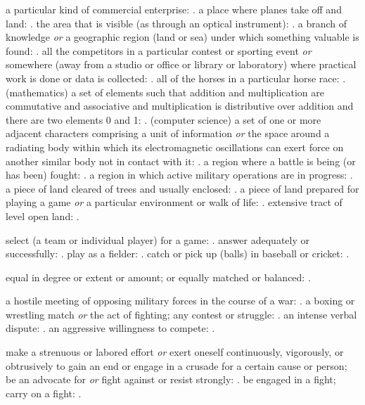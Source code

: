   a particular kind of commercial enterprise: . a place where planes take off and land: . the area that is visible (as through an optical instrument): . a branch of knowledge \textit{or} a geographic region (land or sea) under which something valuable is found: . all the competitors in a particular contest or sporting event \textit{or} somewhere (away from a studio or office or library or laboratory) where practical work is done or data is collected: . all of the horses in a particular horse race: . (mathematics) a set of elements such that addition and multiplication are commutative and associative and multiplication is distributive over addition and there are two elements 0 and 1: . (computer science) a set of one or more adjacent characters comprising a unit of information \textit{or} the space around a radiating body within which its electromagnetic oscillations can exert force on another similar body not in contact with it: . a region where a battle is being (or has been) fought: . a region in which active military operations are in progress: . a piece of land cleared of trees and usually enclosed: . a piece of land prepared for playing a game \textit{or} a particular environment or walk of life: . extensive tract of level open land: .

  select (a team or individual player) for a game: . answer adequately or successfully: . play as a fielder: . catch or pick up (balls) in baseball or cricket: .

  equal in degree or extent or amount; or equally matched or balanced: .

  a hostile meeting of opposing military forces in the course of a war: . a boxing or wrestling match \textit{or} the act of fighting; any contest or struggle: . an intense verbal dispute: . an aggressive willingness to compete: .

  make a strenuous or labored effort \textit{or} exert oneself continuously, vigorously, or obtrusively to gain an end or engage in a crusade for a certain cause or person; be an advocate for \textit{or} fight against or resist strongly: . be engaged in a fight; carry on a fight: .

